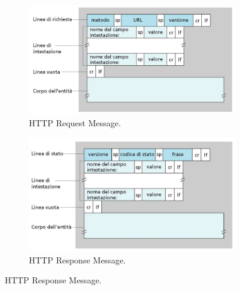 \documentclass[11pt, italian, openany]{book}
\begin{document}
\begin{sloppypar}
\begin{itemize}[topsep=0pt]
\pagebreak

	\begin{figure}[h!]
		\begin{subfigure}{0.49 \linewidth} \centering
			\includegraphics[scale=0.25]{images/http-request.png}
			\caption{HTTP Request Message.}
		\end{subfigure}
		\begin{subfigure}{0.49 \linewidth} \centering
			\includegraphics[scale=0.25]{images/http-response.png}
			\caption{HTTP Response Message.}
		\end{subfigure}
	\end{figure}


\end{itemize}
\end{sloppypar}
\end{document}
